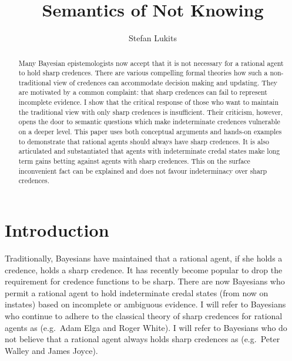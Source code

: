 \documentclass[11pt]{article}
\begin{document}

\title{Semantics of Not Knowing}
\author{Stefan Lukits}
\date{}
\maketitle
{}

\begin{abstract}
  {\noindent}Many Bayesian epistemologists now accept that it is not
  necessary for a rational agent to hold sharp credences. There are
  various compelling formal theories how such a non-traditional view
  of credences can accommodate decision making and updating. They are
  motivated by a common complaint: that sharp credences can fail to
  represent incomplete evidence. I show that the critical response of
  those who want to maintain the traditional view with only sharp
  credences is insufficient. Their criticism, however, opens the door
  to semantic questions which make indeterminate credences vulnerable
  on a deeper level. This paper uses both conceptual arguments and
  hands-on examples to demonstrate that rational agents should always
  have sharp credences. It is also articulated and substantiated that
  agents with indeterminate credal states make long term gains betting
  against agents with sharp credences. This on the surface
  inconvenient fact can be explained and does not favour indeterminacy
  over sharp credences.
\end{abstract}

\section{Introduction}
\label{Introduction}

Traditionally, Bayesians have maintained that a rational agent, if she
holds a credence, holds a sharp credence. It has recently become
popular to drop the requirement for credence functions to be sharp.
There are now Bayesians who permit a rational agent to hold
indeterminate credal states (from now on instates) based on incomplete
or ambiguous evidence. I will refer to Bayesians who continue to
adhere to the classical theory of sharp credences for rational agents
as  (e.g.\ Adam Elga and Roger White). I will refer
to Bayesians who do not believe that a rational agent always holds
sharp credences as  (e.g.\ Peter Walley and James
Joyce).
\end{document}
